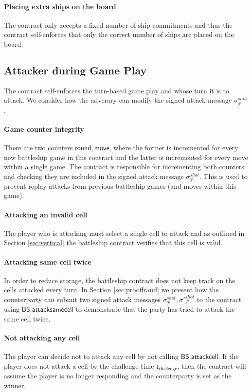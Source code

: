 \documentclass{llncs}
\newcommand{\participant}{\mathcal{P}}
\newcommand{\battleshipattackcell}{\mathsf{BS.attackcell}}
\newcommand{\battleshipsamecell}{\mathsf{BS.attacksamecell}}
\newcommand{\timechallenge}{\mathsf{t}_{\mathsf{challenge}}}
\begin{document}
\paragraph{Placing extra ships on the board} 
The contract only accepts a fixed number of ship commitments and thus the contract self-enforces that only the correct number of ships are placed on the board. 

\subsection{Attacker during Game Play} 

The contract self-enforces the turn-based game play and whose turn it is to attack.
We consider how the adverary can modify the signed attack message $\sigma^{shot}_{\participant}$. 

\paragraph{Game counter integrity}
There are two counters $\mathsf{round},\mathsf{move}$, where the former is incremented for every new battleship game in this contract and the latter is incremented for every move within a single game. 
The contract is responsible for incrementing both counters and checking they are included in the signed attack message $\sigma^{shot}_{\participant}$.
This is used to prevent replay attacks from previous battleship games (and moves within this game). 

\paragraph{Attacking an invalid cell}
The player who is attacking must select a single cell to attack and as outlined in Section \ref{sec:vertical} the battleship contract verifies that this cell is valid. 

\paragraph{Attacking same cell twice} 
In order to reduce storage, the battleship contract does not keep track on the cells attacked every turn. 
In Section \ref{sec:prooffraud} we present how the counterparty can submit two signed attack messages $\sigma^{shot}_{\participant},\sigma'^{shot}_{\participant}$ to the contract using $\battleshipsamecell$ to demonstrate that the party has tried to attack the same cell twice. 

\paragraph{Not attacking any cell} 
The player can decide not to attack any cell by not calling $\battleshipattackcell$. 
If the player does not attack a cell by the challenge time $\timechallenge$, then the contract will assume the player is no longer responding and the counterparty is set as the winner. 
\end{document}
